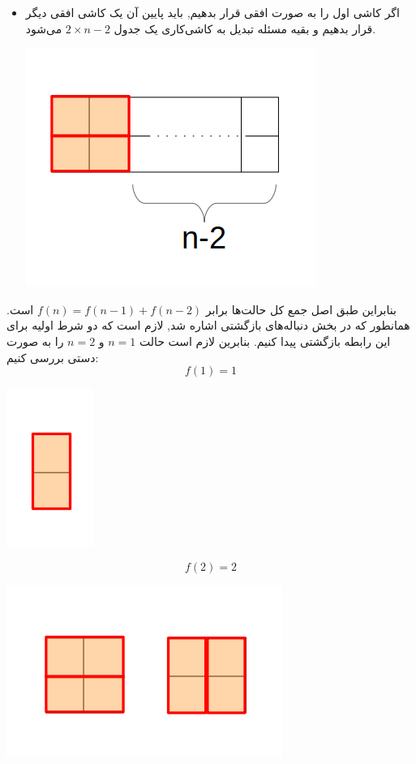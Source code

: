 \begin{PROBLEM}
{\begin{itemize}
\begin{center}
            \end{center}
        \item 
        اگر کاشی اول را به صورت افقی قرار بدهیم, باید پایین آن یک کاشی افقی دیگر قرار بدهیم و بقیه مسئله تبدیل به کاشی‌کاری یک جدول
        $2\times n-2$
        می‌شود.
        \begin{center}
            \includegraphics[totalheight=4cm]{im3.png}
            \end{center}
        \end{itemize}
        بنابراین طبق اصل جمع کل حالت‌ها برابر
        $f(n)=f(n-1)+f(n-2)$
        است.
        \p
        همانطور که در بخش دنباله‌های بازگشتی اشاره شد, لازم است که دو شرط اولیه برای این رابطه بازگشتی پیدا کنیم. بنابرین لازم است حالت
        $n=1$
        و
        $n=2$
        را به صورت دستی بررسی کنیم:
        $$f(1)=1$$
        \begin{center}
            \includegraphics[totalheight=3cm]{im5.png}
            \end{center}
        $$f(2)=2$$
        \begin{center}
            \includegraphics[totalheight=3cm]{im4.png}
            \end{center}
   
    }

 \end{PROBLEM}


